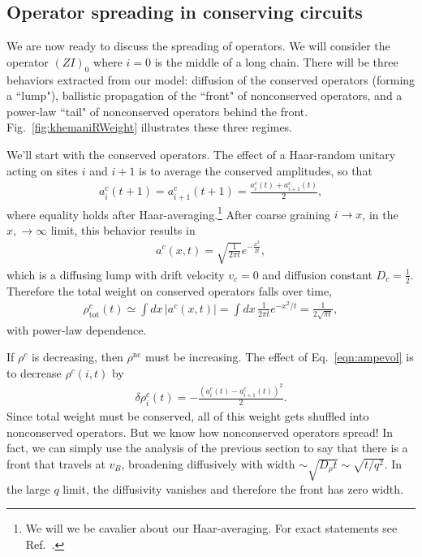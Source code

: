 \documentclass[a4paper,11pt]{article}
\renewcommand{\th}[1]{\frac{1}{#1}}
\newcommand{\abs}[1]{\left| #1 \right|}
\newcommand{\nc}{\text{nc}}
\newcommand{\tot}{\text{tot}}
\begin{document}
\subsection{Operator spreading in conserving circuits} \label{sub:consop}

We are now ready to discuss the spreading of operators. We will consider the operator $(ZI)_0$ where $i=0$ is the middle of a long chain. There will be three behaviors extracted from our model: diffusion of the conserved operators (forming a ``lump"), ballistic propagation of the ``front" of nonconserved operators, and a power-law ``tail" of nonconserved operators behind the front. Fig.~\ref{fig:khemaniRWeight} illustrates these three regimes.

We'll start with the conserved operators. The effect of a Haar-random unitary acting on sites $i$ and $i+1$ is to average the conserved amplitudes, so that
\begin{align}
a^c_i(t+1)=a^c_{i+1}(t+1) = \frac{a^c_i(t)+a^c_{i+1}(t)}{2}, \label{eqn:ampevol}
\end{align}
where equality holds after Haar-averaging.\footnote{We will we be cavalier about our Haar-averaging. For exact statements see Ref.~\cite{KhemaniOpSp}.} After coarse graining $i\to x$, in the $x, \to\infty$ limit, this behavior results in 
\begin{align}
a^c(x,t) = \sqrt{\frac{1}{2\pi t}}e^{-\frac{x^2}{2t}},
\end{align}
which is a diffusing lump with drift velocity $v_c=0$ and diffusion constant $D_c=\th{2}$. Therefore the total weight on conserved operators falls over time,
\begin{align}
\rho^c_\tot(t) \simeq \int dx\,\abs{a^c(x,t)} = \int dx\,\th{2\pi t}e^{-x^2/t} 
	=\th{2\sqrt{\pi t}}, \label{eqn:rhoc}
\end{align}
with power-law dependence.

If $\rho^c$ is decreasing, then $\rho^\nc$ must be increasing. The effect of Eq.~\ref{eqn:ampevol} is to decrease $\rho^c(i,t)$ by
\begin{align}
\delta \rho^c_i(t) = -\frac{(a^c_i(t)-a^c_{i+1}(t))^2}{2}.
\end{align}
Since total weight must be conserved, all of this weight gets shuffled into nonconserved operators. But we know how nonconserved operators spread! In fact, we can simply use the analysis of the previous section to say that there is a front that travels at $v_B$, broadening diffusively with width $\sim\sqrt{D_\rho t}\sim\sqrt{t/q^2}$. In the large $q$ limit, the diffusivity vanishes and therefore the front has zero width.
\end{document}
